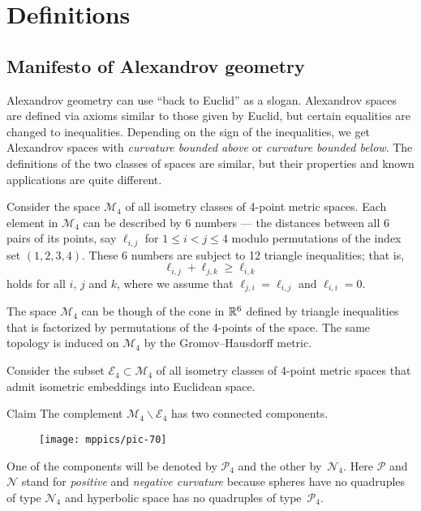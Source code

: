 \chapter{Definitions}

\section{Manifesto of Alexandrov geometry}

Alexandrov geometry can use ``back to Euclid'' as a slogan.
Alexandrov spaces are defined via axioms similar to those given by Euclid,
but certain  equalities are changed to inequalities. 
Depending on the sign of the inequalities, we get Alexandrov spaces with \emph{curvature bounded above} or \emph{curvature bounded below}.
The definitions of the two classes of spaces are similar, but their properties and known applications are quite different.


Consider the space $\mathcal{M}_4$ of all isometry classes of 4-point metric spaces.
Each element in $\mathcal{M}_4$ can be described by 6 numbers 
 --- the distances between all 6 pairs of its points, say $\ell_{i,j}$ for $1\le i< j\le 4$ modulo permutations of the index set $(1,2,3,4)$.
These 6 numbers are subject to 12 triangle inequalities; that is,
\[\ell_{i,j}+\ell_{j,k}\ge \ell_{i,k}\]
holds for all $i$, $j$ and $k$, where we assume that $\ell_{j,i}=\ell_{i,j}$ and $\ell_{i,i}=0$.

The space $\mathcal{M}_4$ can be though of the cone in $\mathbb{R}^6$ defined by triangle inequalities that is factorized by permutations of the 4-points of the space.
The same topology is induced on $\mathcal{M}_4$ by the Gromov--Hausdorff metric.

Consider the subset $\mathcal{E}_4\subset \mathcal{M}_4$ of all isometry classes of 4-point metric spaces that admit isometric embeddings into Euclidean space.

\begin{thm}{Claim}\label{clm:two-components-of-M4}
The complement $\mathcal{M}_4\backslash \mathcal{E}_4$ has two connected components.
\end{thm}

\begin{wrapfigure}{o}{33mm}
\vskip-0mm
\centering
\texttt{[image: mppics/pic-70]}
\end{wrapfigure}

One of the components will be denoted by $\mathcal{P}_4$ and the other by~$\mathcal{N}_4$.
Here $\mathcal{P}$ and $\mathcal{N}$ stand for {}\emph{positive} 
and {}\emph{negative curvature} because spheres have no quadruples of type $\mathcal{N}_4$ and 
hyperbolic space
has no quadruples of type~$\mathcal{P}_4$.

